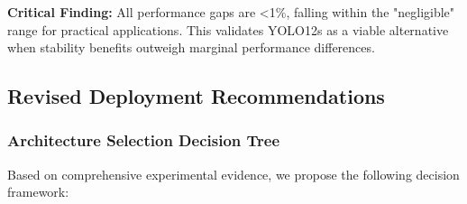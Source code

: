 \textbf{Critical Finding:} All performance gaps are <1\%, falling within the "negligible" range for practical applications. This validates YOLO12s as a viable alternative when stability benefits outweigh marginal performance differences.

\subsection{Revised Deployment Recommendations}

\subsubsection{Architecture Selection Decision Tree}

Based on comprehensive experimental evidence, we propose the following decision framework:

